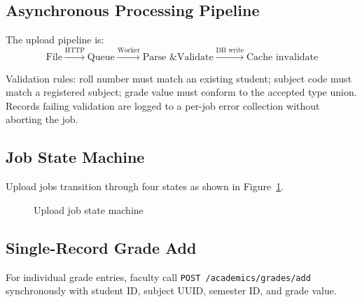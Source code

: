 \documentclass[12pt,a4paper]{report}
\newcommand{\api}[1]{\texttt{\small #1}}
\begin{document}
\subsection{Asynchronous Processing Pipeline}

The upload pipeline is:
\begin{equation}
  \text{File} \xrightarrow{\text{HTTP}} \text{Queue} \xrightarrow{\text{Worker}} \text{Parse \& Validate} \xrightarrow{\text{DB write}} \text{Cache invalidate}
\end{equation}

Validation rules: roll number must match an existing student; subject code must match a registered subject; grade value must conform to the accepted type union. Records failing validation are logged to a per-job error collection without aborting the job.

\subsection{Job State Machine}

Upload jobs transition through four states as shown in Figure~\ref{fig:jobstate}.

\begin{figure}[H]
\centering
{}
\caption{Upload job state machine}
\label{fig:jobstate}
\end{figure}

\subsection{Single-Record Grade Add}

For individual grade entries, faculty call \api{POST /academics/grades/add} synchronously with student ID, subject UUID, semester ID, and grade value.
\end{document}
